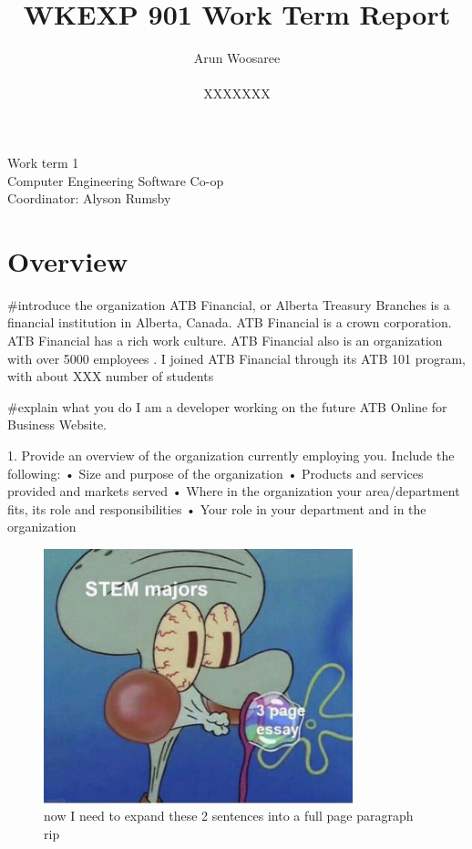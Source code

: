 \documentclass[letterpaper,12pt]{article}
\title{WKEXP 901 Work Term Report}
\author{Arun Woosaree \\ \\  XXXXXXX}
\begin{document}
\begin{titlepage}
 \maketitle
 \thispagestyle{empty}
 \centering
 \large
 \vspace{1cm}
 Work term 1\\
 \vspace{1cm}
 Computer Engineering Software Co-op \\
 \vspace{1cm}
 Coordinator: Alyson Rumsby
\end{titlepage}

\section{Overview}

\#introduce the organization
ATB Financial, or Alberta Treasury Branches is a financial institution in Alberta, Canada.
ATB Financial is a crown corporation.
ATB Financial has a rich work culture.
ATB Financial also is an organization with over 5000 employees \cite{annualreport2017}.
I joined ATB Financial through its ATB 101 program, with about XXX number of students

\#explain what you do
I am a developer working on the future ATB Online for Business Website.

1.	Provide an overview of the organization currently employing you. Include the following:
•	Size and purpose of the organization
•	Products and services provided and markets served
•	Where in the organization your area/department fits, its role and responsibilities
•	Your role in your department and in the organization

\begin{figure}[h]
 \centering
 \includegraphics[width=0.8\textwidth]{stem.jpg}
 \caption{now I need to expand these 2 sentences into a full page paragraph rip}
\end{figure}
\end{document}
